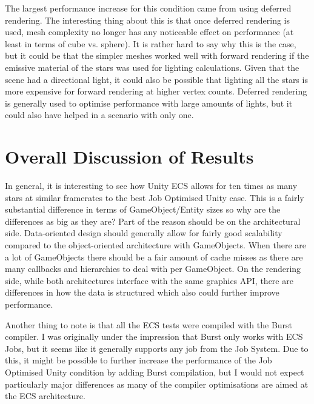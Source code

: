 The largest performance increase for this condition came from using deferred rendering. The interesting thing about this is that once deferred rendering is used, mesh complexity no longer has any noticeable effect on performance (at least in terms of cube vs. sphere). It is rather hard to say why this is the case, but it could be that the simpler meshes worked well with forward rendering if the emissive material of the stars was used for lighting calculations. Given that the scene had a directional light, it could also be possible that lighting all the stars is more expensive for forward rendering at higher vertex counts. Deferred rendering is generally used to optimise performance with large amounts of lights, but it could also have helped in a scenario with only one. 

\section{Overall Discussion of Results}\label{sec:overalldisc}
In general, it is interesting to see how Unity ECS allows for ten times as many stars at similar framerates to the best Job Optimised Unity case. This is a fairly substantial difference in terms of GameObject/Entity sizes so why are the differences as big as they are? Part of the reason should be on the architectural side. Data-oriented design should generally allow for fairly good scalability compared to the object-oriented architecture with GameObjects. When there are a lot of GameObjects there should be a fair amount of cache misses as there are many callbacks and hierarchies to deal with per GameObject. On the rendering side, while both architectures interface with the same graphics API, there are differences in how the data is structured which also could further improve performance. 

Another thing to note is that all the ECS tests were compiled with the Burst compiler. I was originally under the impression that Burst only works with ECS Jobs, but it seems like it generally supports any job from the Job System. Due to this, it might be possible to further increase the performance of the Job Optimised Unity condition by adding Burst compilation, but I would not expect particularly major differences as many of the compiler optimisations are aimed at the ECS architecture. 

